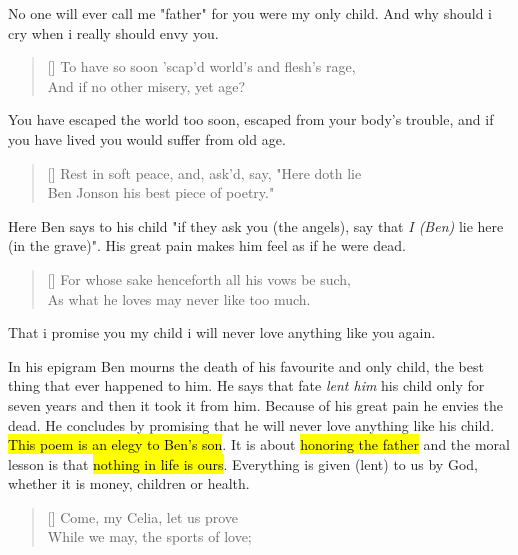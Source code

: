 No one will ever call me "father" for you were my only child.
And why should i cry when i really should envy you.

\begin{verse}[\versewidth]
{\fontverse
To have so soon 'scap'd world's and flesh's rage, \\
And if no other misery, yet age?
}
\end{verse}

You have escaped the world too soon, escaped from your
body's trouble, and if you have lived you would suffer from old age.\bigbreak

\begin{verse}[\versewidth]
{\fontverse
Rest in soft peace, and, ask'd, say, "Here doth lie \\
Ben Jonson his best piece of poetry." 
}
\end{verse}

Here Ben says to his child "if they ask you (the angels), say that 
\textit{I (Ben)} lie here (in the grave)". His great pain makes him
feel as if he were dead.

\begin{verse}[\versewidth]
{\fontverse
For whose sake henceforth all his vows be such, \\
As what he loves may never like too much. 
}
\end{verse}


That i promise you my child i will never love anything like you 
again.\medbreak



In his epigram Ben mourns the death of his favourite and only child, the best thing
that ever happened to him. He says that fate \textit{lent him} his child
only for seven years and then it took it from him. Because of his great
pain he envies the dead. He concludes by promising that he will never love
anything like his child. \hl{This poem is an elegy to Ben's
son}. It is about \hl{honoring the father} and the moral lesson
is that \hl{nothing in life is ours}. Everything is given 
(lent) to us by God, whether it is money, children or health.

\settowidth{\versewidth}{Come, my Celia, let us prove}
\begin{verse}[\versewidth]
{\fontverse
Come, my Celia, let us prove\\
While we may, the sports of love;
}
\end{verse}

